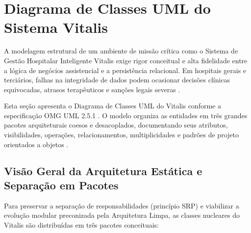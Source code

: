 
\section{Diagrama de Classes UML do Sistema Vitalis}
\label{sec:diagrama_classes}

A modelagem estrutural de um ambiente de missão crítica como o Sistema de Gestão Hospitalar Inteligente Vitalis exige rigor conceitual e alta fidelidade entre a lógica de negócios assistencial e a persistência relacional. Em hospitais gerais e terciários, falhas na integridade de dados podem ocasionar decisões clínicas equivocadas, atrasos terapêuticos e sanções legais severas \cite{sommerville:2019, pressman:2016}.

Esta seção apresenta o Diagrama de Classes UML do Vitalis conforme a especificação OMG UML 2.5.1 \cite{omg_uml:2017}. O modelo organiza as entidades em três grandes pacotes arquiteturais coesos e desacoplados, documentando seus atributos, visibilidades, operações, relacionamentos, multiplicidades e padrões de projeto orientados a objetos \cite{gamma_design_patterns:1994, fowler_patterns:2002}.

\subsection{Visão Geral da Arquitetura Estática e Separação em Pacotes}
\label{subsec:visao_geral_classes}

Para preservar a separação de responsabilidades (princípio SRP) e viabilizar a evolução modular preconizada pela Arquitetura Limpa, as classes nucleares do Vitalis são distribuídas em três pacotes conceituais:

